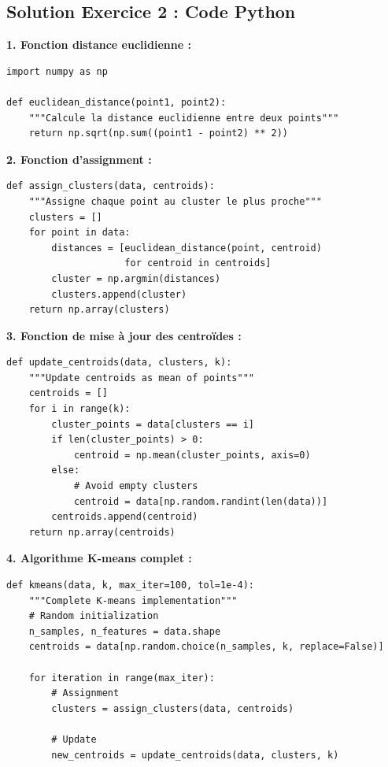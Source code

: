 \documentclass[11pt,a4paper]{article}
\begin{document}
\subsection{Solution Exercice 2 : Code Python}

\begin{solutionbox}
\textbf{1. Fonction distance euclidienne :}

\begin{lstlisting}
import numpy as np

def euclidean_distance(point1, point2):
    """Calcule la distance euclidienne entre deux points"""
    return np.sqrt(np.sum((point1 - point2) ** 2))
\end{lstlisting}

\textbf{2. Fonction d'assignment :}

\begin{lstlisting}
def assign_clusters(data, centroids):
    """Assigne chaque point au cluster le plus proche"""
    clusters = []
    for point in data:
        distances = [euclidean_distance(point, centroid) 
                     for centroid in centroids]
        cluster = np.argmin(distances)
        clusters.append(cluster)
    return np.array(clusters)
\end{lstlisting}

\textbf{3. Fonction de mise à jour des centroïdes :}

\begin{lstlisting}
def update_centroids(data, clusters, k):
    """Update centroids as mean of points"""
    centroids = []
    for i in range(k):
        cluster_points = data[clusters == i]
        if len(cluster_points) > 0:
            centroid = np.mean(cluster_points, axis=0)
        else:
            # Avoid empty clusters
            centroid = data[np.random.randint(len(data))]
        centroids.append(centroid)
    return np.array(centroids)
\end{lstlisting}

\textbf{4. Algorithme K-means complet :}

\begin{lstlisting}
def kmeans(data, k, max_iter=100, tol=1e-4):
    """Complete K-means implementation"""
    # Random initialization
    n_samples, n_features = data.shape
    centroids = data[np.random.choice(n_samples, k, replace=False)]
    
    for iteration in range(max_iter):
        # Assignment
        clusters = assign_clusters(data, centroids)
        
        # Update
        new_centroids = update_centroids(data, clusters, k)
        

\end{lstlisting}
\end{solutionbox}
\end{document}
